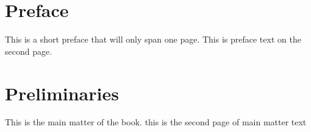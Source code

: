 \documentclass{amsbook}
\begin{document}
\frontmatter
\chapter*{Preface}
This is a short preface that will only span one page.
\newpage
This is preface text on the second page.

\mainmatter
\chapter*{Preliminaries}
This is the main matter of the book.
\newpage
this is the second page of main matter text
\end{document}
